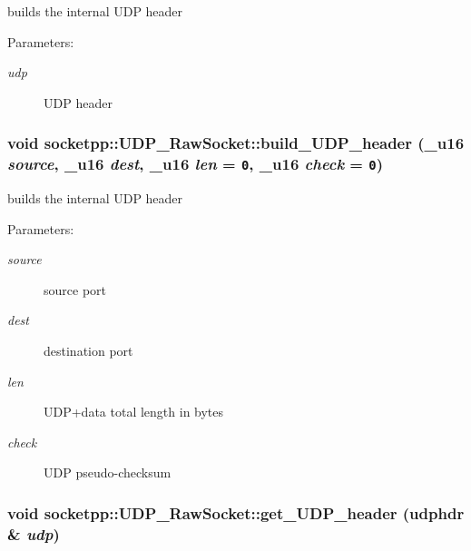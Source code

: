 builds the internal UDP header 

\begin{Desc}
\item[Parameters:]
\begin{description}
\item[{\em udp}]UDP header \end{description}
\end{Desc}
\hypertarget{classsocketpp_1_1UDP__RawSocket_1b055bafc0e178db6a3940093dc0f8e0}{
\subsubsection[{build\_\-UDP\_\-header}]{\setlength{\rightskip}{0pt plus 5cm}void socketpp::UDP\_\-RawSocket::build\_\-UDP\_\-header (\_\-u16 {\em source}, \/  \_\-u16 {\em dest}, \/  \_\-u16 {\em len} = {\tt 0}, \/  \_\-u16 {\em check} = {\tt 0})}}
\label{classsocketpp_1_1UDP__RawSocket_1b055bafc0e178db6a3940093dc0f8e0}


builds the internal UDP header 

\begin{Desc}
\item[Parameters:]
\begin{description}
\item[{\em source}]source port \item[{\em dest}]destination port \item[{\em len}]UDP+data total length in bytes \item[{\em check}]UDP pseudo-checksum \end{description}
\end{Desc}
\hypertarget{classsocketpp_1_1UDP__RawSocket_597a30fc537dce06c85663add29defdc}{
\subsubsection[{get\_\-UDP\_\-header}]{\setlength{\rightskip}{0pt plus 5cm}void socketpp::UDP\_\-RawSocket::get\_\-UDP\_\-header (udphdr \& {\em udp})}}
\label{classsocketpp_1_1UDP__RawSocket_597a30fc537dce06c85663add29defdc}


